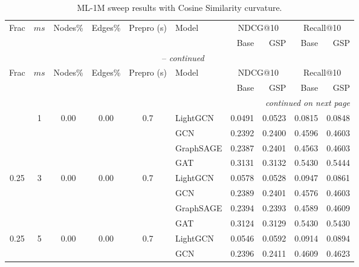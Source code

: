 {\footnotesize
\setlength{\tabcolsep}{4pt}
\begin{longtable}{cccccl rrrr}
\caption{ML-1M sweep results with Cosine Similarity curvature.}
\label{tab:ml1m_cosine_sweep} \\
\toprule
\multirow{2}{*}{Frac} & \multirow{2}{*}{$ms$} & \multirow{2}{*}{Nodes\%} & \multirow{2}{*}{Edges\%} & \multirow{2}{*}{Prepro (s)} & \multirow{2}{*}{Model} &
  \multicolumn{2}{c}{NDCG@10} & \multicolumn{2}{c}{Recall@10} \\
\cmidrule(lr){7-8}\cmidrule(lr){9-10}
 & & & & & & Base & GSP & Base & GSP \\
\midrule
\endfirsthead
\multicolumn{10}{c}{\tablename~\thetable{} -- \textit{continued}} \\
\toprule
\multirow{2}{*}{Frac} & \multirow{2}{*}{$ms$} & \multirow{2}{*}{Nodes\%} & \multirow{2}{*}{Edges\%} & \multirow{2}{*}{Prepro (s)} & \multirow{2}{*}{Model} &
  \multicolumn{2}{c}{NDCG@10} & \multicolumn{2}{c}{Recall@10} \\
\cmidrule(lr){7-8}\cmidrule(lr){9-10}
 & & & & & & Base & GSP & Base & GSP \\
\midrule
\endhead
\midrule \multicolumn{10}{r}{\textit{continued on next page}} \\
\endfoot
\bottomrule
\endlastfoot
\multirow{4}{*}{0.25} & \multirow{4}{*}{1} & \multirow{4}{*}{0.00} & \multirow{4}{*}{0.00} & \multirow{4}{*}{0.7} & LightGCN & 0.0491 & 0.0523 & 0.0815 & 0.0848 \\
 & & & & & GCN & 0.2392 & 0.2400 & 0.4596 & 0.4603 \\
 & & & & & GraphSAGE & 0.2387 & 0.2401 & 0.4563 & 0.4603 \\
 & & & & & GAT & 0.3131 & 0.3132 & 0.5430 & 0.5444 \\
\midrule
\multirow{4}{*}{0.25} & \multirow{4}{*}{3} & \multirow{4}{*}{0.00} & \multirow{4}{*}{0.00} & \multirow{4}{*}{0.7} & LightGCN & 0.0578 & 0.0528 & 0.0947 & 0.0861 \\
 & & & & & GCN & 0.2389 & 0.2401 & 0.4576 & 0.4603 \\
 & & & & & GraphSAGE & 0.2394 & 0.2393 & 0.4589 & 0.4609 \\
 & & & & & GAT & 0.3124 & 0.3129 & 0.5430 & 0.5430 \\
\midrule
\multirow{4}{*}{0.25} & \multirow{4}{*}{5} & \multirow{4}{*}{0.00} & \multirow{4}{*}{0.00} & \multirow{4}{*}{0.7} & LightGCN & 0.0546 & 0.0592 & 0.0914 & 0.0894 \\
 & & & & & GCN & 0.2396 & 0.2411 & 0.4609 & 0.4623 \\

\end{longtable}}
